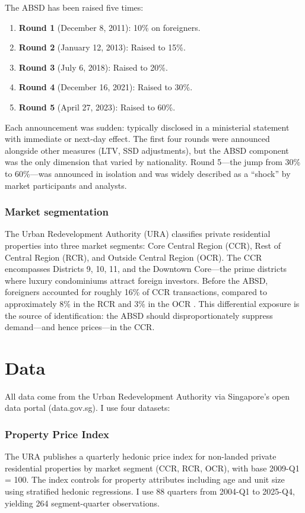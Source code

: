 \documentclass[12pt]{article}
\begin{document}
The ABSD has been raised five times:

\begin{enumerate}
    \item \textbf{Round 1} (December 8, 2011): 10\% on foreigners.
    \item \textbf{Round 2} (January 12, 2013): Raised to 15\%.
    \item \textbf{Round 3} (July 6, 2018): Raised to 20\%.
    \item \textbf{Round 4} (December 16, 2021): Raised to 30\%.
    \item \textbf{Round 5} (April 27, 2023): Raised to 60\%.
\end{enumerate}

Each announcement was sudden: typically disclosed in a ministerial statement with immediate or next-day effect. The first four rounds were announced alongside other measures (LTV, SSD adjustments), but the ABSD component was the only dimension that varied by nationality. Round 5---the jump from 30\% to 60\%---was announced in isolation and was widely described as a ``shock'' by market participants and analysts.

\subsubsection*{Market segmentation} The Urban Redevelopment Authority (URA) classifies private residential properties into three market segments: Core Central Region (CCR), Rest of Central Region (RCR), and Outside Central Region (OCR). The CCR encompasses Districts 9, 10, 11, and the Downtown Core---the prime districts where luxury condominiums attract foreign investors. Before the ABSD, foreigners accounted for roughly 16\% of CCR transactions, compared to approximately 8\% in the RCR and 3\% in the OCR \citep{Deng2018, URA2023}. This differential exposure is the source of identification: the ABSD should disproportionately suppress demand---and hence prices---in the CCR.

\section{Data}\label{sec:data}

All data come from the Urban Redevelopment Authority via Singapore's open data portal (data.gov.sg). I use four datasets:

\subsubsection*{Property Price Index} The URA publishes a quarterly hedonic price index for non-landed private residential properties by market segment (CCR, RCR, OCR), with base 2009-Q1 = 100. The index controls for property attributes including age and unit size using stratified hedonic regressions. I use 88 quarters from 2004-Q1 to 2025-Q4, yielding 264 segment-quarter observations.
\end{document}
